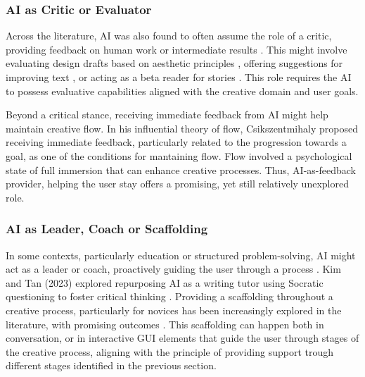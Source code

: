 \subsubsection{AI as Critic or Evaluator}
Across the literature, AI was also found to often assume the role of a critic, providing feedback on human work or intermediate results \cite{Lin2023-zq}. This might involve evaluating design drafts based on aesthetic principles \cite{Zhou2024-vp}, offering suggestions for improving text \cite{Chakrabarty2024-ov}, or acting as a beta reader for stories \cite{Ippolito2022-mf}. This role requires the AI to possess evaluative capabilities aligned with the creative domain and user goals.

Beyond a critical stance, receiving immediate feedback from AI might help maintain creative flow. In his influential theory of flow, Csikszentmihaly \cite{Csikszentmihalyi1990-hu} proposed receiving immediate feedback, particularly related to the progression towards a goal, as one of the conditions for mantaining flow. Flow involved a psychological state of full immersion that can enhance creative processes. Thus, AI-as-feedback provider, helping the user stay offers a promising, yet still relatively unexplored role. 

\subsubsection{AI as Leader, Coach or Scaffolding}

In some contexts, particularly education or structured problem-solving, AI might act as a leader or coach, proactively guiding the user through a process \cite{Zhong2024-ij}. Kim and Tan (2023) explored repurposing AI as a writing tutor using Socratic questioning to foster critical thinking \cite{Kim2023-wt}. Providing a scaffolding throughout a creative process, particularly for novices has been increasingly explored in the literature, with promising outcomes \cite{Yuan2022-kb, Fan2019-qq, Ding2024-ta, Long2019-lw, Louie2020-aq, Ippolito2022-mf, Wadinambiarachchi2024-jn}. This scaffolding can happen both in conversation, or in interactive GUI elements that guide the user through stages of the creative process, aligning with the principle of providing support trough different stages identified in the previous section. 


